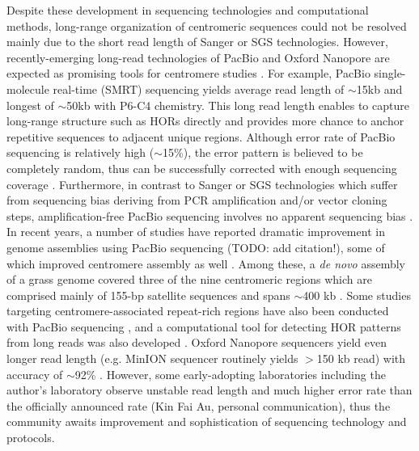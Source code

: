 Despite these development in sequencing technologies and computational methods, long-range organization of centromeric sequences could not be resolved mainly due to the short read length of Sanger or SGS technologies. However, recently-emerging long-read technologies of PacBio \cite{Eid2009} and Oxford Nanopore \cite{Jain2016} are expected as promising tools for centromere studies \cite{Aldrup-MacDonald2014, Miga2015}. For example, PacBio single-molecule real-time (SMRT) sequencing yields average read length of $\sim$15kb and longest of $\sim$50kb with P6-C4 chemistry. This long read length enables to capture long-range structure such as HORs directly and provides more chance to anchor repetitive sequences to adjacent unique regions. Although error rate of PacBio sequencing is relatively high ($\sim$15\%), the error pattern is believed to be completely random, thus can be successfully corrected with enough sequencing coverage \cite{Myers2014}. Furthermore, in contrast to Sanger or SGS technologies which suffer from sequencing bias deriving from PCR amplification and/or vector cloning steps, amplification-free PacBio sequencing involves no apparent sequencing bias \cite{Ross2013}. In recent years, a number of studies have reported dramatic improvement in genome assemblies using PacBio sequencing (TODO: add citation!), some of which improved centromere assembly as well \cite{VanBuren2015, Vij2016, Jiao2016}. Among these, a \textit{de novo} assembly of a grass genome covered three of the nine centromeric regions which are comprised mainly of 155-bp satellite sequences and spans $\sim$400 kb \cite{VanBuren2015}. Some studies targeting centromere-associated repeat-rich regions have also been conducted with PacBio sequencing \cite{Wolfgruber2016, Khost2016}, and a computational tool for detecting HOR patterns from long reads was also developed \cite{Sevim2016}. Oxford Nanopore sequencers yield even longer read length (e.g. MinION sequencer routinely yields $>$150 kb read) with accuracy of $\sim$92\% \cite{Jain2016}. However, some early-adopting laboratories including the author's laboratory observe unstable read length and much higher error rate than the officially announced rate (Kin Fai Au, personal communication), thus the community awaits improvement and sophistication of sequencing technology and protocols.

